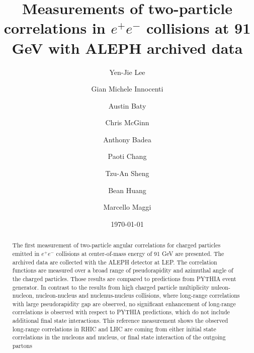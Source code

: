 \documentclass[aps,prl,twocolumn,showpacs,superscriptaddress,groupedaddress]{revtex4}  %
\begin{document}
\widetext
{}

\title{Measurements of two-particle correlations in $e^+e^-$ collisions at 91 GeV with ALEPH archived data}
\author{Yen-Jie Lee}
\author{Gian Michele Innocenti}
\author{Austin Baty}
\author{Chris McGinn}
\author{Anthony Badea}
%
\author{Paoti Chang}
\author{Tzu-An Sheng}
\author{Bean Huang}
%
\author{Marcello Maggi}
%
\date{\today}


\begin{abstract}
The first measurement of two-particle angular correlations for charged particles emitted in $e^+e^-$ collisions at center-of-mass energy of 91 GeV are presented. The archived data are collected with the ALEPH detector at LEP. The correlation functions are measured over a broad range of pseudorapidity and azimuthal angle of the charged particles. Those results are compared to predictions from PYTHIA event generator. In contrast to the results from high charged particle multiplicity nuleon-nucleon, nucleon-nucleus and nuclenus-nucleus collisions, where long-range correlations with large pseudorapidity gap are observed, no significant enhancement of long-range correlations is observed with respect to PYTHIA predictions, which do not include additional final state interactions. This reference measurement shows the observed long-range correlations in RHIC and LHC are coming from either initial state correlations in the nucleons and nucleus, or final state interaction of the outgoing partons
\end{abstract}

\pacs{}
\maketitle

\end{document}
